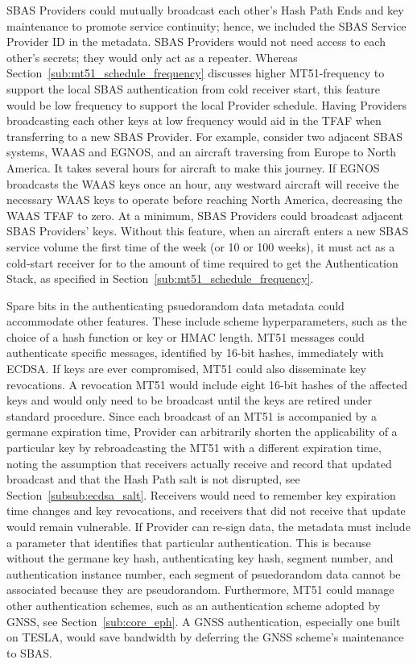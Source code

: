 \documentclass[APA,STIX1COL]{IONjournal/ION-APA Template}
\begin{document}
		SBAS Providers could mutually broadcast each other's Hash Path Ends and key maintenance to promote service continuity; hence, we included the SBAS Service Provider ID in the metadata.
		SBAS Providers would not need access to each other's secrets; they would only act as a repeater.
		Whereas Section~\ref{sub:mt51_schedule_frequency} discusses higher MT51-frequency to support the local SBAS authentication from cold receiver start, this feature would be low frequency to support the local Provider schedule.
		Having Providers broadcasting each other keys at low frequency would aid in the TFAF when transferring to a new SBAS Provider.
		For example, consider two adjacent SBAS systems, WAAS and EGNOS, and an aircraft traversing from Europe to North America.
		It takes several hours for aircraft to make this journey.
		If EGNOS broadcasts the WAAS keys once an hour, any westward aircraft will receive the necessary WAAS keys to operate before reaching North America, decreasing the WAAS TFAF to zero. 
		At a minimum, SBAS Providers could broadcast adjacent SBAS Providers' keys.
		Without this feature, when an aircraft enters a new SBAS service volume the first time of the week (or 10 or 100 weeks), it must act as a cold-start receiver for to the amount of time required to get the Authentication Stack, as specified in Section~\ref{sub:mt51_schedule_frequency}.

		Spare bits in the authenticating psuedorandom data metadata could accommodate other features.
		These include scheme hyperparameters, such as the choice of a hash function or key or HMAC length.
		MT51 messages could authenticate specific messages, identified by 16-bit hashes, immediately with ECDSA.
		If keys are ever compromised, MT51 could also disseminate key revocations.
		A revocation MT51 would include eight 16-bit hashes of the affected keys and would only need to be broadcast until the keys are retired under standard procedure.
		Since each broadcast of an MT51 is accompanied by a germane expiration time, Provider can arbitrarily shorten the applicability of a particular key by rebroadcasting the MT51 with a different expiration time, noting the assumption that receivers actually receive and record that updated broadcast and that the Hash Path salt is not disrupted, see Section~\ref{subsub:ecdsa_salt}.
		Receivers would need to remember key expiration time changes and key revocations, and receivers that did not receive that update would remain vulnerable.
		If Provider can re-sign data, the metadata must include a parameter that identifies that particular authentication.
		This is because without the germane key hash, authenticating key hash, segment number, and authentication instance number, each segment of psuedorandom data cannot be associated because they are pseudorandom.
		Furthermore, MT51 could manage other authentication schemes, such as an authentication scheme adopted by GNSS, see Section~\ref{sub:core_eph}.
		A GNSS authentication, especially one built on TESLA, would save bandwidth by deferring the GNSS scheme's maintenance to SBAS.
\end{document}
